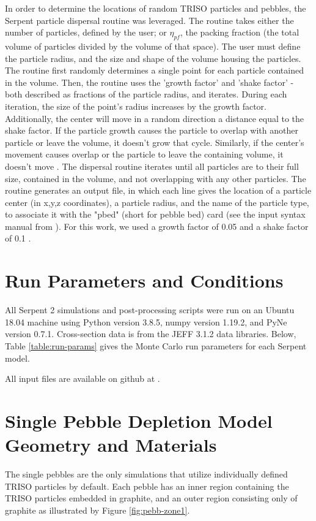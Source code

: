 In order to determine the locations of random TRISO particles and pebbles, the Serpent particle dispersal routine was leveraged.  The routine takes either the number of particles, defined by the user; or $\eta_{pf}$, the packing fraction (the total volume of particles divided by the volume of that space).  The user must define the particle radius, and the size and shape of the volume housing the particles.  The routine first randomly determines a single point for each particle contained in the volume.  Then, the routine uses the 'growth factor' and 'shake factor' - both described as fractions of the particle radius, and iterates.  During each iteration, the size of the point's radius increases by the growth factor.  Additionally, the center will move in a random direction a distance equal to the shake factor.  If the particle growth causes the particle to overlap with another particle or leave the volume, it doesn't grow that cycle.  Similarly, if the center's movement causes overlap or the particle to leave the containing volume, it doesn't move \cite{cole_gentry_generate_2015}.  The dispersal routine iterates until all particles are to their full size, contained in the volume, and not overlapping with any other particles.  The routine generates an output file, in which each line gives the location of a particle center (in x,y,z coordinates), a particle radius, and the name of the particle type, to associate it with the "pbed" (short for pebble bed) card (see the input syntax manual from \cite{leppanenjaakko_serpent_2015}).  For this work, we used a growth factor of 0.05 and a shake factor of 0.1 \cite{cole_gentry_generate_2015}.

\section{Run Parameters and Conditions}
\label{sec-run-params}

All Serpent 2 simulations and post-processing scripts were run on an Ubuntu 18.04 machine using Python version 3.8.5, numpy version 1.19.2, and PyNe version 0.7.1.  Cross-section data is from the JEFF 3.1.2 data libraries.  Below, Table \ref{table:run-params} gives the Monte Carlo run parameters for each Serpent model.



All input files are available on github at \cite{richter_zoerichterphlox_2022}.

\section{Single Pebble Depletion Model Geometry and Materials}
\label{meth-burn}
The single pebbles are the only simulations that utilize individually defined TRISO particles by default.  Each pebble has an inner region containing the TRISO particles embedded in graphite, and an outer region consisting only of graphite as illustrated by Figure \ref{fig:pebb-zone1}.

